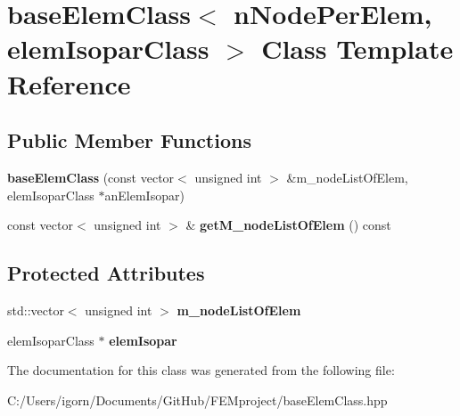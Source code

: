 \hypertarget{classbase_elem_class}{}\section{base\+Elem\+Class$<$ n\+Node\+Per\+Elem, elem\+Isopar\+Class $>$ Class Template Reference}
\label{classbase_elem_class}
\subsection*{Public Member Functions}
\begin{DoxyCompactItemize}
\item 
\mbox{\label{classbase_elem_class_a7e33ae151758d75c499d7ee0b97ab287}} 
{\bfseries base\+Elem\+Class} (const vector$<$ unsigned int $>$ \&m\+\_\+node\+List\+Of\+Elem, elem\+Isopar\+Class $\ast$an\+Elem\+Isopar)
\item 
\mbox{\label{classbase_elem_class_ae616abd15173b932f84b824bc12f1457}} 
const vector$<$ unsigned int $>$ \& {\bfseries get\+M\+\_\+node\+List\+Of\+Elem} () const
\end{DoxyCompactItemize}
\subsection*{Protected Attributes}
\begin{DoxyCompactItemize}
\item 
\mbox{\label{classbase_elem_class_a1cb4530f826f6fb4522508df64602497}} 
std\+::vector$<$ unsigned int $>$ {\bfseries m\+\_\+node\+List\+Of\+Elem}
\item 
\mbox{\label{classbase_elem_class_a3f9ecf7b0c75d0e4a99f24d85784ee98}} 
elem\+Isopar\+Class $\ast$ {\bfseries elem\+Isopar}
\end{DoxyCompactItemize}


The documentation for this class was generated from the following file\+:\begin{DoxyCompactItemize}
\item 
C\+:/\+Users/igorn/\+Documents/\+Git\+Hub/\+F\+E\+Mproject/base\+Elem\+Class.\+hpp\end{DoxyCompactItemize}

